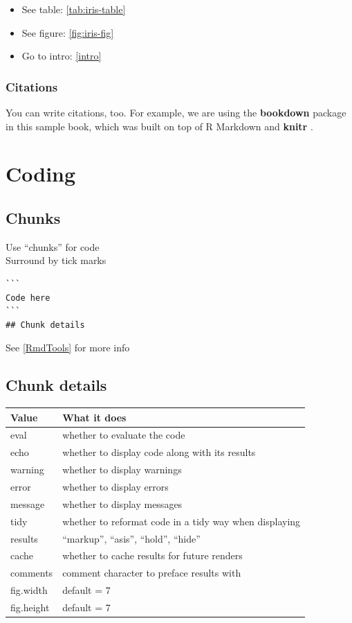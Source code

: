 \documentclass[
]{book}
\providecommand{\tightlist}{%
  \setlength{\itemsep}{0pt}\setlength{\parskip}{0pt}}
\begin{document}
\begin{itemize}
\tightlist
\item
  See table: \ref{tab:iris-table}\\
\item
  See figure: \ref{fig:iris-fig}\\
\item
  Go to intro: \ref{intro}
\end{itemize}

\hypertarget{citations}{%
\subsection{Citations}\label{citations}}

You can write citations, too. For example, we are using the \textbf{bookdown} package \citep{R-bookdown} in this sample book, which was built on top of R Markdown and \textbf{knitr} \citep{xie2015}.

\hypertarget{RCoding}{%
\chapter{Coding}\label{RCoding}}

\hypertarget{chunks}{%
\section{Chunks}\label{chunks}}

Use ``chunks'' for code\\
Surround by tick marks

\begin{verbatim}
```
Code here   
```
## Chunk details
\end{verbatim}

See \ref{RmdTools} for more info

\hypertarget{chunk-details}{%
\section{Chunk details}\label{chunk-details}}

\begin{longtable}[]{@{}ll@{}}
\toprule
Value & What it does\tabularnewline
\midrule
\endhead
eval & whether to evaluate the code\tabularnewline
echo & whether to display code along with its results\tabularnewline
warning & whether to display warnings\tabularnewline
error & whether to display errors\tabularnewline
message & whether to display messages\tabularnewline
tidy & whether to reformat code in a tidy way when displaying\tabularnewline
results & ``markup'', ``asis'', ``hold'', ``hide''\tabularnewline
cache & whether to cache results for future renders\tabularnewline
comments & comment character to preface results with\tabularnewline
fig.width & default = 7\tabularnewline
fig.height & default = 7\tabularnewline
\bottomrule
\end{longtable}
\end{document}
